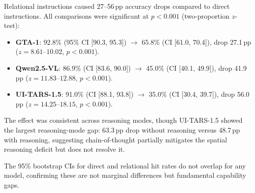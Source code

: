 Relational instructions caused 27--56\,pp accuracy drops compared to
direct instructions. All comparisons were significant at $p < 0.001$
(two-proportion $z$-test):

\begin{itemize}[nosep]
  \item \textbf{GTA-1}: 92.8\% (95\% CI [90.3, 95.3])
    $\to$ 65.8\% (CI [61.0, 70.4]),
    drop 27.1\,pp ($z = 8.61$--$10.02$, $p < 0.001$).
  \item \textbf{Qwen2.5-VL}: 86.9\% (CI [83.6, 90.0])
    $\to$ 45.0\% (CI [40.1, 49.9]),
    drop 41.9\,pp ($z = 11.83$--$12.88$, $p < 0.001$).
  \item \textbf{UI-TARS-1.5}: 91.0\% (CI [88.1, 93.8])
    $\to$ 35.0\% (CI [30.4, 39.7]),
    drop 56.0\,pp ($z = 14.25$--$18.15$, $p < 0.001$).
\end{itemize}

The effect was consistent across reasoning modes, though UI-TARS-1.5
showed the largest reasoning-mode gap: 63.3\,pp drop without reasoning
versus 48.7\,pp with reasoning, suggesting chain-of-thought partially
mitigates the spatial reasoning deficit but does not resolve it.

The 95\% bootstrap CIs for direct and relational hit rates do not
overlap for any model, confirming these are not marginal differences
but fundamental capability gaps.
